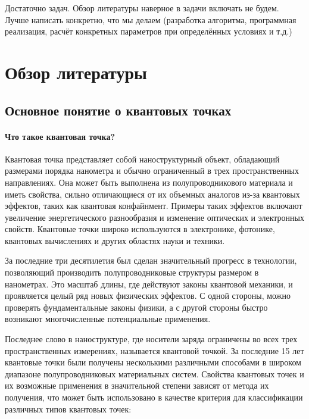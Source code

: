 \documentclass[a4paper,14pt]{extarticle}
\begin{document}
Достаточно задач. Обзор литературы наверное в задачи включать не будем. Лучше написать конкретно, что мы делаем (разработка алгоритма, программная реализация, расчёт конкретных параметров при определённых условиях и т.д.)

\pagebreak
\section{Обзор литературы}

\subsection{Основное понятие о квантовых точках}

\paragraph{Что такое квантовая точка?}

Квантовая точка представляет собой наноструктурный объект, обладающий размерами порядка нанометра и обычно ограниченный в трех пространственных направлениях. Она может быть выполнена из полупроводникового материала и иметь свойства, сильно отличающиеся от их объемных аналогов из-за квантовых эффектов, таких как квантовая конфайнмент. Примеры таких эффектов включают увеличение энергетического разнообразия и изменение оптических и электронных свойств. Квантовые точки широко используются в электронике, фотонике, квантовых вычислениях и других областях науки и техники.

За последние три десятилетия был сделан значительный прогресс в технологии, позволяющий производить полупроводниковые структуры размером в нанометрах. Это масштаб длины, где действуют законы квантовой механики, и проявляется целый ряд новых физических эффектов. С одной стороны, можно проверять фундаментальные законы физики, а с другой стороны быстро возникают многочисленные потенциальные применения.\cite{vukmirovic}

Последнее слово в наноструктуре, где носители заряда ограничены во всех трех пространственных измерениях, называется квантовой точкой. За последние 15 лет квантовые точки были получены несколькими различными способами в широком диапазоне полупроводниковых материальных систем. Свойства квантовых точек и их возможные применения в значительной степени зависят от метода их получения, что может быть использовано в качестве критерия для классификации различных типов квантовых точек:\cite{vukmirovic}
\end{document}
